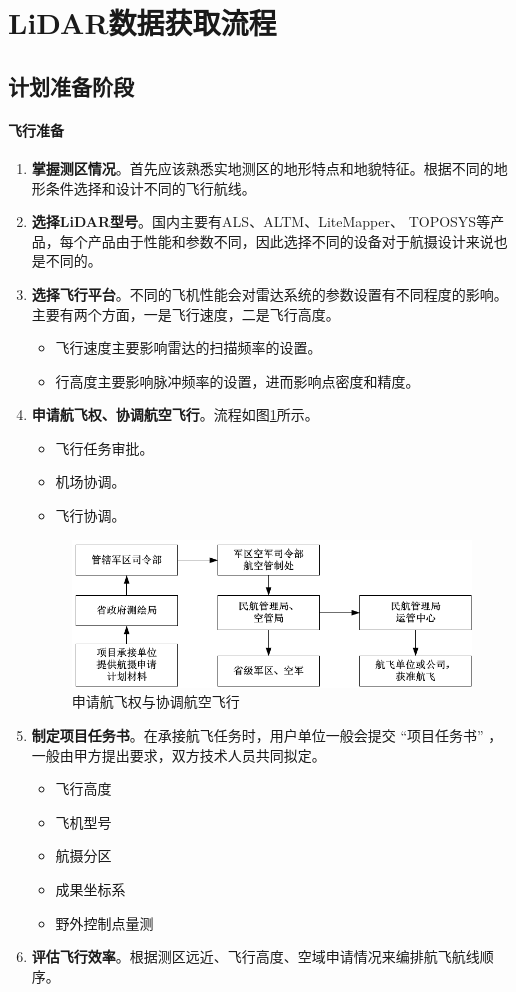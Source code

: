 \section{LiDAR数据获取流程}
\subsection{计划准备阶段}

\paragraph{飞行准备}
\begin{enumerate}
	\item \textbf{掌握测区情况}。首先应该熟悉实地测区的地形特点和地貌特征。根据不同的地形条件选择和设计不同的飞行航线。
	\item \textbf{选择LiDAR型号}。国内主要有ALS、ALTM、LiteMapper、 TOPOSYS等产品，每个产品由于性能和参数不同，因此选择不同的设备对于航摄设计来说也是不同的。
	\item \textbf{选择飞行平台}。不同的飞机性能会对雷达系统的参数设置有不同程度的影响。主要有两个方面，一是飞行速度，二是飞行高度。
		\begin{itemize}
			\item 飞行速度主要影响雷达的扫描频率的设置。
			\item 行高度主要影响脉冲频率的设置，进而影响点密度和精度。
		\end{itemize}
	\item \textbf{申请航飞权、协调航空飞行}。流程如图\ref{fig:申请航飞权与协调航空飞行}所示。
		\begin{itemize}
			\item 飞行任务审批。
			\item 机场协调。
			\item 飞行协调。
		\end{itemize}
		\begin{figure}[htbp]
			\centering
			\includegraphics[width=0.7\linewidth]{figure/Chapter5/申请航飞权与协调航空飞行}
			\caption{申请航飞权与协调航空飞行}
			\label{fig:申请航飞权与协调航空飞行}
		\end{figure}
	\item \textbf{制定项目任务书}。在承接航飞任务时，用户单位一般会提交 “项目任务书” ，一般由甲方提出要求，双方技术人员共同拟定。
		\begin{itemize}
			\item 飞行高度
			\item 飞机型号
			\item 航摄分区
			\item 成果坐标系
			\item 野外控制点量测
		\end{itemize}
	\item \textbf{评估飞行效率}。根据测区远近、飞行高度、空域申请情况来编排航飞航线顺序。
\end{enumerate}

